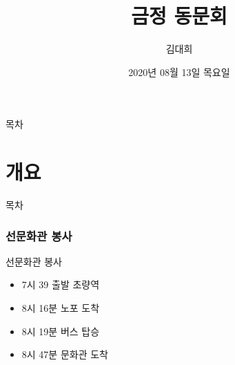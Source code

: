 \documentclass[aspectratio=1610,17pt,xcolor=pdftex,dvipsnames,table,handout]{beamer}
\begin{document}
	

			\title{금정 동문회  }

			\author{김대희}

			\date{2020년 
					08월 
					13일
					목요일 }



		\begin{frame}[plain]
		\titlepage
		\end{frame}



		\begin{frame} {목차}
		\tableofcontents
		\end{frame}

		\part{개요 }
		\frame{\partpage}


		\begin{frame} [plain]{목차}
		\tableofcontents
		\end{frame}
		

		\section{선문화관 봉사 }
		

		\begin{frame} [t,plain]
			\begin{block} {선문화관 봉사 }
			\begin{itemize}
				\item 7시 39 출발 초량역
				\item 8시 16분 노포 도착
				\item 8시 19분 버스 탑승
				\item 8시 47분 문화관 도착
			\end{itemize}
			\end{block}
		\end{frame}
\end{document}
